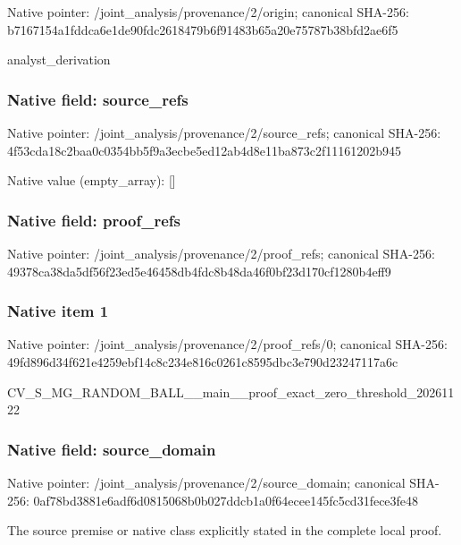 \documentclass[10pt,a4paper]{article}
\begin{document}
Native pointer: /joint\_analysis/provenance/2/origin; canonical SHA-256: b7167154a1fddca6e1de90fd\allowbreak{}c2618479b6f91483b65a20e7\allowbreak{}5787b38bfd2ae6f5


analyst\_derivation


\subsubsection{Native field: source\_refs}


Native pointer: /joint\_analysis/provenan\allowbreak{}ce/2/source\_refs; canonical SHA-256: 4f53cda18c2baa0c0354bb5f\allowbreak{}9a3ecbe5ed12ab4d8e11ba87\allowbreak{}3c2f11161202b945



Native value (empty\_array): []



\subsubsection{Native field: proof\_refs}


Native pointer: /joint\_analysis/provenance/2/proof\_refs; canonical SHA-256: 49378ca38da5df56f23ed5e4\allowbreak{}6458db4fdc8b48da46f0bf23\allowbreak{}d170cf1280b4eff9



\subsubsection{Native item 1}


Native pointer: /joint\_analysis/provenan\allowbreak{}ce/2/proof\_refs/0; canonical SHA-256: 49fd896d34f621e4259ebf14\allowbreak{}c8c234e816c0261c8595dbc3\allowbreak{}e790d23247117a6c


CV\_S\_MG\_RANDOM\_BALL\_\_mai\allowbreak{}n\_\_proof\_exact\_zero\_thre\allowbreak{}shold\_20261122


\subsubsection{Native field: source\_domain}


Native pointer: /joint\_analysis/provenan\allowbreak{}ce/2/source\_domain; canonical SHA-256: 0af78bd3881e6adf6d081506\allowbreak{}8b0b027ddcb1a0f64ecee145\allowbreak{}fc5cd31fece3fe48


The source premise or native class explicitly stated in the complete local proof.
\end{document}
